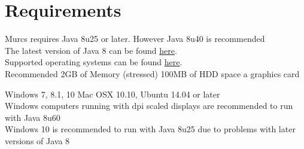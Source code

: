 \section{Requirements}

Murcs requires Java 8u25 or later. However Java 8u40 is recommended\\
The latest version of Java 8 can be found  \href{http://www.oracle.com/technetwork/java/javase/downloads/index-jsp-138363.html}{here}.\\
Supported operating systems can be found
\href{http://www.oracle.com/technetwork/java/javase/certconfig-2095354.html}{here}.\\

Recommended
2GB of Memory (stressed)
100MB of HDD space
a graphics card

Windows 7, 8.1, 10 Mac OSX 10.10, Ubuntu 14.04 or later\\
Windows computers running with dpi scaled displays are recommended to run with Java 8u60\\
Windows 10 is recommended to run with Java 8u25 due to problems with later versions of Java 8
